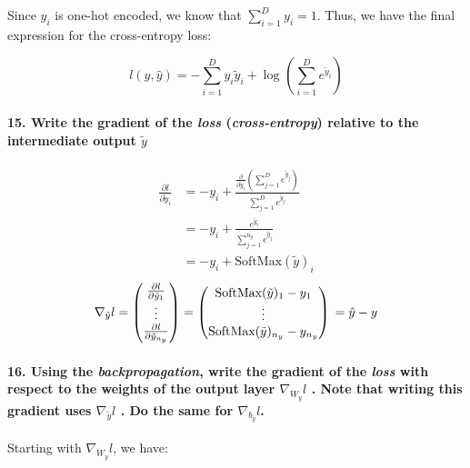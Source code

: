 Since $y_i$ is one-hot encoded, we know that $\sum_{i=1}^{D} y_i = 1$. Thus, we have the final expression for the cross-entropy loss:

\[ l(y, \hat{y}) = - \sum_{i=1}^{D} y_i \tilde{y}_i + \log_{} \left(\sum_{i=1}^{D} e^{\tilde{y}_i}\right) \]

\paragraph{15. Write the gradient of the \textit{loss} (\textit{cross-entropy}) relative to the intermediate output $ \tilde{y} $ }
\begin{align*}
    \frac{\partial l}{\partial \tilde{y}_i} & = -y_i + \frac{\frac{\partial }{\partial \tilde{y}_i } (\sum_{j=1}^{D} e^{ \tilde{y}_j })}{\sum_{j=1}^{D} e^{ \tilde{y}_j }} \\
                                            & = - y_i + \frac{e^{\tilde{y}_i}}{\sum_{j=1}^{n_y} e^{ \tilde{y}_j}}                                                          \\
                                            & = - y_i + \text{SoftMax}(\tilde{y})_i
\end{align*}
\[
    \nabla _{\tilde{y}}l = \begin{pmatrix}
        \frac{\partial l}{\partial \tilde{y}_1} \\
        \vdots                                  \\
        \frac{\partial l}{\partial \tilde{y}_{n_y}}
    \end{pmatrix} = \begin{pmatrix}
        \text{SoftMax}(\tilde{y})_1 - y_1 \\
        \vdots                            \\
        \text{SoftMax}(\tilde{y})_{n_y} - y_{n_y}
    \end{pmatrix} \\
    = \hat{y} - y
\]

\paragraph{16. Using the \textit{backpropagation}, write the gradient of the \textit{loss} with respect to the weights of the output layer $ \nabla _{W_y}l $ . Note that writing this gradient uses $ \nabla _{\tilde{y}}l $ . Do the same for $ \nabla _{b_y}l $.\\}

Starting with \( \nabla _{W_y} l \), we have:

